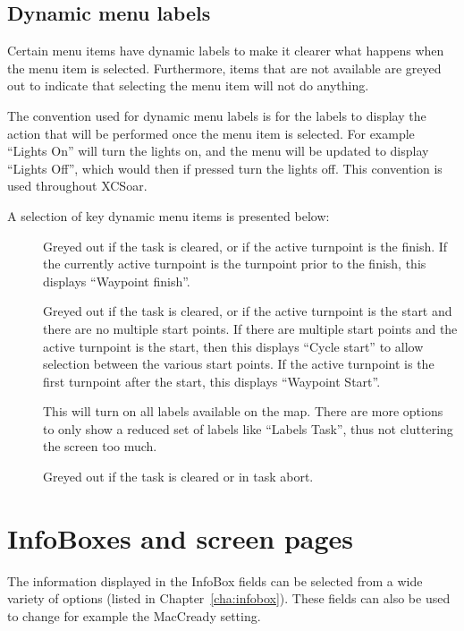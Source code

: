 \subsection*{Dynamic menu labels}
Certain menu items have dynamic labels to make it clearer what happens when the
menu item is selected.  Furthermore, items that are not available are greyed
out to indicate that selecting the menu item will not do anything.

The convention used for dynamic menu labels is for the labels to display the
action that will be performed once the menu item is selected. For example 
``Lights On'' will turn the lights on, and the menu will be updated to display
``Lights Off'', which would then if pressed turn the lights off. This
convention is used throughout XCSoar.

A selection of key dynamic menu items is presented below:
\begin{description}
\item[]  
  Greyed out if the task is cleared, or if the active turnpoint is the
  finish. If the currently active turnpoint is the turnpoint prior to the 
  finish, this displays  ``Waypoint finish''.
\item[]  
  Greyed out if the task is cleared, or if the active turnpoint is the
  start and there are no multiple start points.  If there are multiple
  start points and the active turnpoint is the start, then this
  displays ``Cycle start'' to allow selection between the various
  start points.  If the active turnpoint is the first turnpoint after 
  the start, this displays ``Waypoint Start''.
\item[]  
  This will turn on all labels available on the map. There are more options to 
  only show a reduced set of labels like ``Labels Task'', thus not cluttering the 
  screen too much.
\item[]  
  Greyed out if the task is cleared or in task abort.
\end{description}


\section{InfoBoxes and screen pages}\label{sec:infoboxandpages}

The information displayed in the InfoBox fields can be selected from a
wide variety of options (listed in Chapter~\ref{cha:infobox}). These
fields can also be used to change for example the MacCready setting.

